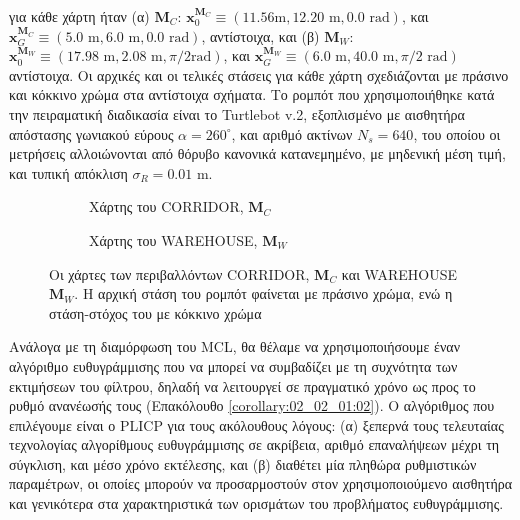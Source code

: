 για κάθε χάρτη ήταν (α) $\bm{M}_C$: $\bm{x}_0^{\bm{M}_C} \equiv (11.56\text{
  m}, 12.20\text{ m}, 0.0 \text{ rad})$, και $\bm{x}_G^{\bm{M}_C} \equiv (5.0
\text{ m}, 6.0 \text{ m}, 0.0 \text{ rad})$, αντίστοιχα, και (β) $\bm{M}_W$:
$\bm{x}_0^{\bm{M}_W} \equiv (17.98 \text{ m}, 2.08 \text{ m}, \pi/2 \text{
  rad})$, και $\bm{x}_G^{\bm{M}_W} \equiv (6.0 \text{ m}, 40.0 \text{ m}, \pi/2
\text{ rad})$ αντίστοιχα. Οι αρχικές και οι τελικές στάσεις για κάθε χάρτη
σχεδιάζονται με πράσινο και κόκκινο χρώμα στα αντίστοιχα σχήματα.  Το ρομπότ
που χρησιμοποιήθηκε κατά την πειραματική διαδικασία είναι το Turtlebot v.2,
εξοπλισμένο με αισθητήρα απόστασης γωνιακού εύρους $\alpha = 260^{\circ}$, και
αριθμό ακτίνων $N_s = 640$, του οποίου οι μετρήσεις αλλοιώνονται από θόρυβο
κανονικά κατανεμημένο, με μηδενική μέση τιμή, και τυπική απόκλιση $\sigma_R =
0.01$ m.

\begin{figure}\hspace{0.5cm}
  \begin{subfigure}{0.49\linewidth}\centering
    \vspace{1.0cm}
    
    \vspace{1.0cm}
    \caption{\small Χάρτης του CORRIDOR, $\bm{M}_C$}
    \label{fig:02_02_04:map_corridor}
  \end{subfigure}\hfill
  \begin{subfigure}{0.49\linewidth} \centering
    
    \vspace{0.25cm}
    \caption{\small Χάρτης του WAREHOUSE, $\bm{M}_W$}
    \label{fig:02_02_04:map_warehouse}
  \end{subfigure}
  \caption{\small Οι χάρτες των περιβαλλόντων CORRIDOR, $\bm{M}_C$ και
           WAREHOUSE $\bm{M}_W$. Η αρχική στάση του ρομπότ φαίνεται με πράσινο
           χρώμα, ενώ η στάση-στόχος του με κόκκινο χρώμα}
\label{fig:02_02_04:maps}
\end{figure}

Ανάλογα με τη διαμόρφωση του MCL, θα θέλαμε να χρησιμοποιήσουμε έναν αλγόριθμο
ευθυγράμμισης που να μπορεί να συμβαδίζει με τη συχνότητα των εκτιμήσεων του
φίλτρου, δηλαδή να λειτουργεί σε πραγματικό χρόνο ως προς το ρυθμό ανανέωσής
τους (Επακόλουθο \ref{corollary:02_02_01:02}). Ο αλγόριθμος που επιλέγουμε
είναι ο PLICP \cite{Censi2008a} για τους ακόλουθους λόγους: (α) ξεπερνά τους
τελευταίας τεχνολογίας αλγορίθμους ευθυγράμμισης σε ακρίβεια, αριθμό
επαναλήψεων μέχρι τη σύγκλιση, και μέσο χρόνο εκτέλεσης, και (β) διαθέτει μία
πληθώρα ρυθμιστικών παραμέτρων, οι οποίες μπορούν να προσαρμοστούν στον
χρησιμοποιούμενο αισθητήρα και γενικότερα στα χαρακτηριστικά των ορισμάτων του
προβλήματος ευθυγράμμισης.

